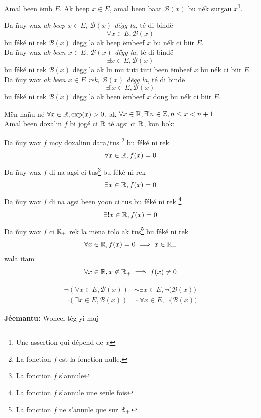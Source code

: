 \documentclass[twoside, a4paper]{article}
\begin{document}
\begin{tcolorbox}[enhanced jigsaw,breakable,pad at break*=1mm, colback=red!5!white,colframe=white!75!black,title= Téeki,
    watermark color=white]
  Amal been ëmb $E$. Ak beep $x\in E$, amal been baat $\mathcal{B}(x)$ bu nék surgau $x$\footnote{Une assertion qui dépend de $x$}.

  Da ñuy wax \textit{ak beep $x\in E$, $\mathcal{B}(x)$ dëgg la}, té di bindë $$\forall x\in E, \mathcal{B}(x)$$ bu féké ni rek $\mathcal{B}(x)$ dëgg la ak beep ëmbeef $x$ bu nék ci biir $E$.\\

  Da ñuy wax \textit{ak been $x\in E$, $\mathcal{B}(x)$ dëgg la}, té di bindë $$\exists x\in E, \mathcal{B}(x)$$ bu féké ni rek $\mathcal{B}(x)$ dëgg la ak lu mu tuti tuti been ëmbeef $x$ bu nék ci biir $E$.\\

  Da ñuy wax \textit{ak been $x\in E$ rek, $\mathcal{B}(x)$ dëgg la}, té di bindë $$\exists! x\in E, \mathcal{B}(x)$$ bu féké ni rek $\mathcal{B}(x)$ dëgg la ak been ëmbeef $x$ dong bu nék ci biir $E$.
\end{tcolorbox}

Mën nañu né $\forall x \in \mathbb{R}, \exp(x) > 0$, ak $\forall x \in \mathbb{R}, \exists ! n \in \mathbb{Z}, n\leq x < n+1$\\

Amal been doxalin $f$ bi jogé ci $\mathbb{R}$ té agsi ci $\mathbb{R}$, kon bok:

Da ñuy wax $f$ moy doxalinu dara/tus \footnote{La fonction $f$ est la fonction nulle.} bu féké ni rek  $$\forall x \in \mathbb{R}, f(x) = 0$$
Da ñuy wax $f$ di na agsi ci tus\footnote{La fonction $f$ s'annule} bu féké ni rek $$\exists x \in \mathbb{R}, f(x) = 0$$
Da ñuy wax $f$ di na agsi been yoon ci tus bu féké ni rek \footnote{La fonction $f$ s'annule une seule fois} $$\exists! x \in \mathbb{R}, f(x) = 0$$
Da ñuy wax $f$ ci $\mathbb{R}_{+}$ rek la mëna tolo ak tus\footnote{La fonction $f$ ne s'annule que sur $\mathbb{R}_{+}$} bu féké ni rek $$\forall x \in \mathbb{R}, f(x) = 0 \implies x \in \mathbb{R}_{+}$$
wala itam $$\forall x \in \mathbb{R}, x \not\in \mathbb{R}_{+} \implies f(x) \neq 0$$


\begin{tcolorbox}[enhanced jigsaw,breakable,pad at break*=1mm, colback=blue!5!white,colframe=white!75!black,title= Tèg\footnote{Proposition},
    watermark color=white]
  \begin{align*}
    \neg(\forall x\in E, \mathcal{B}(x)) & \sim \exists x\in E, \neg \big(\mathcal{B}(x)\big) \\
    \neg(\exists x\in E, \mathcal{B}(x)) & \sim \forall x\in E, \neg \big(\mathcal{B}(x)\big)
  \end{align*}
\end{tcolorbox}
\textbf{Jéemantu:} Woneel tèg yi muj
\end{document}
